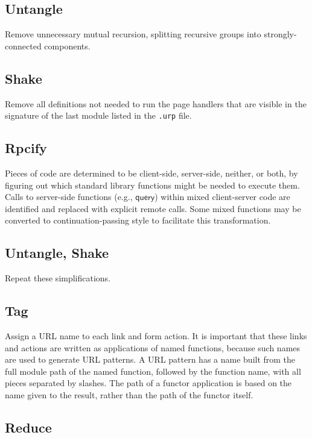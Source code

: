 \documentclass{article}
\newcommand{\mt}[1]{\mathsf{#1}}
\begin{document}
\subsection{Untangle}

Remove unnecessary mutual recursion, splitting recursive groups into strongly-connected components.

\subsection{Shake}

Remove all definitions not needed to run the page handlers that are visible in the signature of the last module listed in the \texttt{.urp} file.

\subsection{Rpcify}

Pieces of code are determined to be client-side, server-side, neither, or both, by figuring out which standard library functions might be needed to execute them.  Calls to server-side functions (e.g., $\mt{query}$) within mixed client-server code are identified and replaced with explicit remote calls.  Some mixed functions may be converted to continuation-passing style to facilitate this transformation.

\subsection{Untangle, Shake}

Repeat these simplifications.

\subsection{\label{tag}Tag}

Assign a URL name to each link and form action.  It is important that these links and actions are written as applications of named functions, because such names are used to generate URL patterns.  A URL pattern has a name built from the full module path of the named function, followed by the function name, with all pieces separated by slashes.  The path of a functor application is based on the name given to the result, rather than the path of the functor itself.

\subsection{Reduce}
\end{document}
